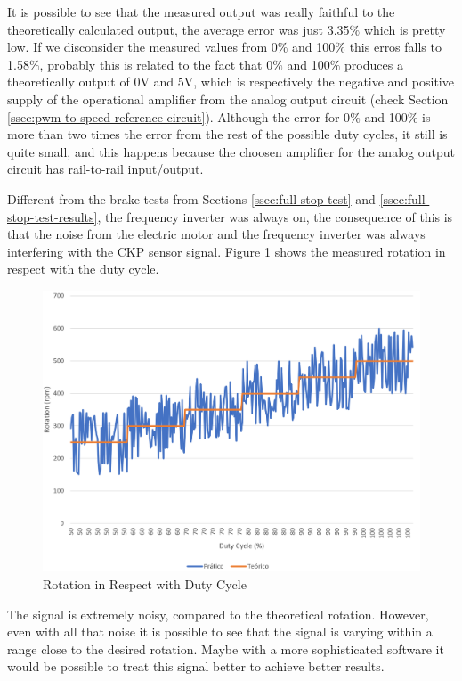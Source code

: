 		It is possible to see that the measured output was really faithful to the theoretically calculated output, the average error was just 3.35$\%$ which is pretty low. If we disconsider the measured values from 0$\%$ and 100$\%$ this erros falls to 1.58$\%$, probably this is related to the fact that 0$\%$ and 100$\%$ produces a theoretically output of 0V and 5V, which is respectively the negative and positive supply of the operational amplifier from the analog output circuit (check Section \ref{ssec:pwm-to-speed-reference-circuit}). Although the error for 0$\%$ and 100$\%$ is more than two times the error from the rest of the possible duty cycles, it still is quite small, and this happens because the choosen amplifier for the analog output circuit has rail-to-rail input/output.
		\par

		Different from the brake tests from Sections \ref{ssec:full-stop-test} and \ref{ssec:full-stop-test-results}, the frequency inverter was always on, the consequence of this is that the noise from the electric motor and the frequency inverter was always interfering with the CKP sensor signal. Figure \ref{fig:test-analog-rotation} shows the measured rotation in respect with the duty cycle.

		\begin{figure}[htbp]
				\centering
				\includegraphics[width=1\textwidth]{figuras/fig-test-analog-rotation}
				\caption{Rotation in Respect with Duty Cycle}
				\label{fig:test-analog-rotation}
		\end{figure}

		The signal is extremely noisy, compared to the theoretical rotation. However, even with all that noise it is possible to see that the signal is varying within a range close to the desired rotation. Maybe with a more sophisticated software it would be possible to treat this signal better to achieve better results.
